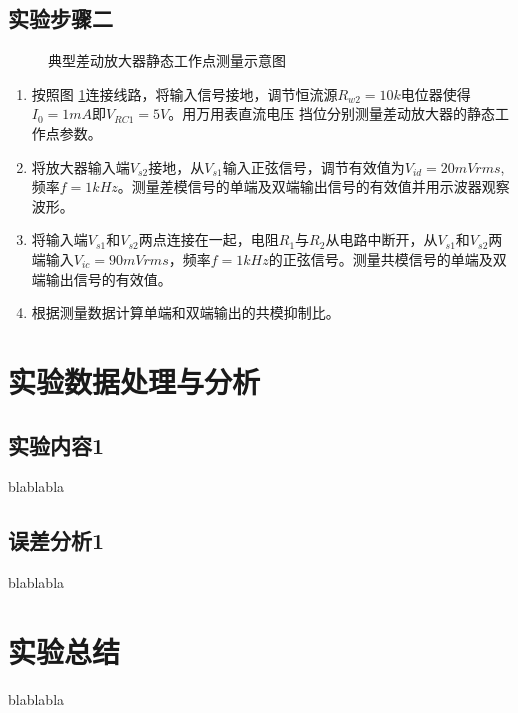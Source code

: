 \documentclass[a4paper,11pt,UTF8]{ctexart}
\begin{document}
\subsection{实验步骤二}
\begin{figure}[htbp]
  \centering
  \caption{典型差动放大器静态工作点测量示意图}
  \label{fig:sStatic}
  \end{figure}
\begin{enumerate}
  \item 按照图 \ref{fig:sStatic}连接线路，将输入信号接地，调节恒流源$R_{w2}=10k$电位器使得$I_0=1mA$即$V_{RC1}=5V$。用万用表直流电压
  挡位分别测量差动放大器的静态工作点参数。
  \item 将放大器输入端$V_{s2}$接地，从$V_{s1}$输入正弦信号，调节有效值为$V_{id}=20mVrms$,频率$f=1kHz$。测量差模信号的单端及双端输出信号的有效值并用示波器观察波形。
  \item 将输入端$V_{s1}$和$V_{s2}$两点连接在一起，电阻$R_1$与$R_2$从电路中断开，从$V_{s1}$和$V_{s2}$两端输入$V_{ic}=90mVrms$，频率$f=1kHz$的正弦信号。测量共模信号的单端及双端输出信号的有效值。
  \item 根据测量数据计算单端和双端输出的共模抑制比。
\end{enumerate}

\section{实验数据处理与分析}
\subsection{实验内容1}
	blablabla
\subsection{误差分析1}
	blablabla

\section{实验总结}
blablabla
\end{document}
